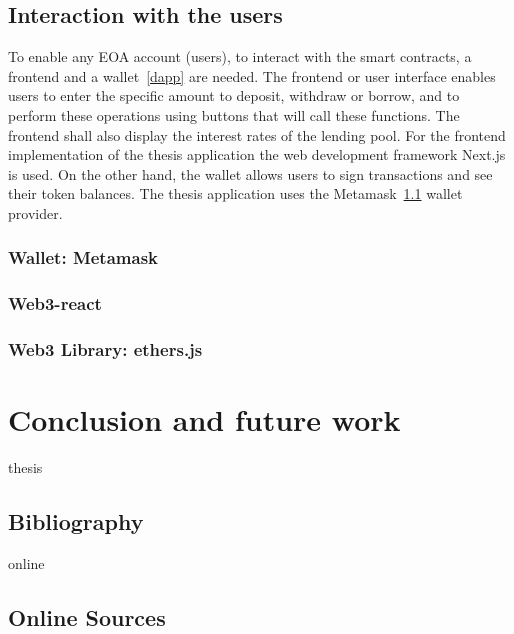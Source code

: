 \documentclass[11pt,a4paper]{report}
\begin{document}
\section{Interaction with the users}
To enable any EOA account (users), to interact with the smart contracts, a frontend and a wallet~\ref{dapp} are needed. The frontend or user interface enables users to enter the specific amount to deposit, withdraw or borrow, and to perform these operations using buttons that will call these functions. The frontend shall also display the interest rates of the lending pool. For the frontend implementation of the thesis application the web development framework Next.js\cite{nextjs} is used. On the other hand, the wallet allows users to sign transactions and see their token balances. The thesis application uses the Metamask~\ref{metamask} wallet provider.
\subsection{Wallet: Metamask}\label{metamask}
\subsection{Web3-react}
\subsection{Web3 Library: ethers.js}

\chapter{Conclusion and future work} \label{ch:conclusion}
\newpage

\begin{btSect}{thesis} %
\section*{Bibliography}
\btPrintCited
\end{btSect}
\begin{btSect}{online}
\section*{Online Sources}
\btPrintCited
\end{btSect}
\end{document}

